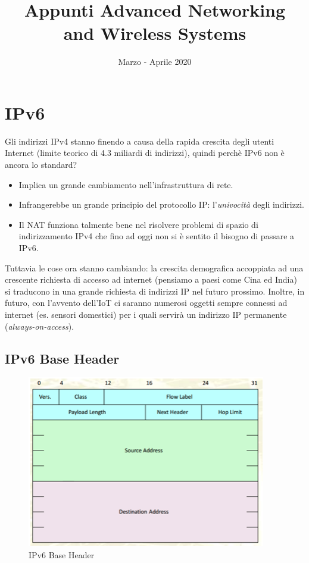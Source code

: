 \documentclass{article}
\title{Appunti Advanced Networking \\ and Wireless Systems}
\author{}
\date{Marzo - Aprile 2020}
\begin{document}
\maketitle

\tableofcontents

\newpage
\section{IPv6}
Gli indirizzi IPv4 stanno finendo a causa della rapida crescita degli utenti Internet (limite teorico di 4.3 miliardi di indirizzi), quindi perchè IPv6 non è ancora lo standard?
\begin{itemize}
    \item Implica un grande cambiamento nell'infrastruttura di rete.
    \item Infrangerebbe un grande principio del protocollo IP: l'\textit{univocità} degli indirizzi.
    \item Il NAT funziona talmente bene nel risolvere problemi di spazio di indirizzamento IPv4 che fino ad oggi non si è sentito il bisogno di passare a IPv6.
\end{itemize}
Tuttavia le cose ora stanno cambiando: la crescita demografica accoppiata ad una crescente richiesta di accesso ad internet (pensiamo a paesi come Cina ed India) si traducono in una grande richiesta di indirizzi IP nel futuro prossimo.
Inoltre, in futuro, con l'avvento dell'IoT ci saranno numerosi oggetti sempre connessi ad internet (es. sensori domestici) per i quali servirà un indirizzo IP permanente (\textit{always-on-access}).

\subsection{IPv6 Base Header}
\begin{figure}[H]
\centering
\includegraphics[scale=0.5]{figures/base header.png}
\caption{IPv6 Base Header}
\end{figure}
\end{document}
